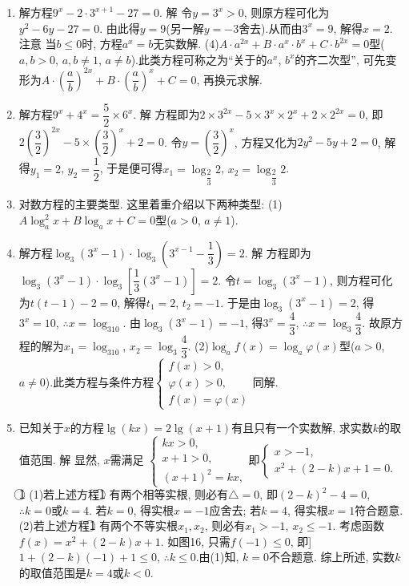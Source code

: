 \documentclass[10pt,a4paper]{article}
\begin{document}
\begin{enumerate}[1.]
\item 解方程$9^x-2\cdot 3^{x+1}-27=0$.
解  令$y=3^x>0$, 则原方程可化为$y^2-6y-27=0$.
由此得$y=9$(另一解$y=-3$舍去).从而由$3^x=9$, 解得$x=2$.
注意  当$b\le 0$时, 方程$a^x=b$无实数解.
(4)$A\cdot a^{2x}+B\cdot a^x\cdot b^x+C\cdot b^{2x}=0$型($a,b>0$, $a,b\ne 1$, $a\ne b$).此类方程可称之为``关于的$a^x$, $b^x$的齐二次型'', 可先变形为$A\cdot (\dfrac ab)^{2x}+B\cdot (\dfrac ab)^x+C=0$, 再换元求解.
\item 解方程$9^x+4^x=\dfrac 52\times 6^x$.
解  方程即为$2\times 3^{2x}-5\times 3^x\times 2^x+2\times 2^{2x}=0$, 即$2(\dfrac 32)^{2x}-5\times (\dfrac 32)^x+2=0$.
令$y=(\dfrac 32)^x$, 方程又化为$2y^2-5y+2=0$, 解得$y_1=2$, $y_2=\dfrac 12$,
于是便可得$x_1=\log _{\dfrac 23}2$, $x_2=\log _{\dfrac 23}2$.
\item 对数方程的主要类型.
这里着重介绍以下两种类型:
(1)$A\log _a^2x+B\log _ax+C=0$型($a>0$, $a\ne 1$).
\item 解方程$\log _3(3^x-1)\cdot \log _3(3^{x-1}-\dfrac 13)=2$.
解  方程即为$\log _3(3^x-1)\cdot \log _3[\dfrac 13(3^x-1)]=2$.
令$t=\log _3(3^x-1)$, 则方程可化为$t(t-1)-2=0$, 解得$t_1=2$, $t_2=-1$.
于是由$\log _3(3^x-1)=2$, 得$3^x=10$, $\therefore x=\log _310$.
由$\log _3(3^x-1)=-1$, 得$3^x=\dfrac 43$, $\therefore x=\log _3\dfrac 43$.
故原方程的解为$x_1=\log _310$, $x_2=\log _3\dfrac 43$.
(2)$\log _af(x)=\log _a\varphi (x)$型($a>0$, $a\ne 0$).此类方程与条件方程$\begin{cases} f(x)>0, \\ \varphi (x)>0, \\ f(x)=\varphi (x) \end{cases}$同解.
\item 已知关于$x$的方程$\lg (kx)=2\lg (x+1)$有且只有一个实数解, 求实数$k$的取值范围.
解  显然, $x$需满足
$\begin{cases} kx>0, \\ x+1>0, \\ (x+1)^2=kx, \end{cases}$即$\begin{cases} x>-1, \\ x^2+(2-k)x+1=0. \end{cases}$  \textcircled{1}
(1)若上述方程\textcircled{1} 有两个相等实根, 则必有$\triangle =0$, 即$(2-k)^2-4=0$,
$\therefore k=0$或$k=4$.
若$k=0$, 得实根$x=-1$应舍去; 若$k=4$, 得实根$x=1$符合题意.
(2)若上述方程\textcircled{1} 有两个不等实根$x_1,x_2$,
则必有$x_1>-1$, $x_2\le -1$.
考虑函数$f(x)=x^2+(2-k)x+1$.
如图16, 只需$f(-1)\le 0$, 即] $1+(2-k)(-1)+1\le 0$,
$\therefore k\le 0$.由(1)知, $k=0$不合题意.
综上所述, 实数$k$的取值范围是$k=4$或$k<0$.

\end{enumerate}
\end{document}
